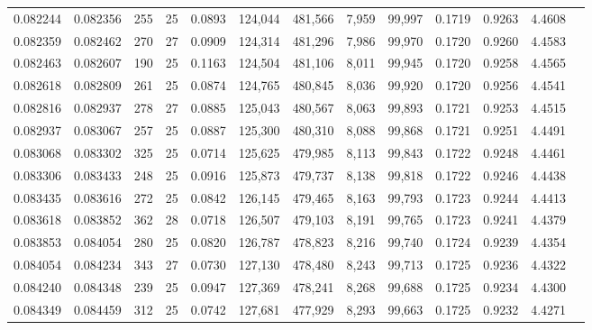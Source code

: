 \begin{tabular}{rrrrrrrrrrrrr}
0.082244 & 0.082356 & 255 &  25 &                                     0.0893 & 124,044 & 481,566 &   7,959 &  99,997 & 0.1719 & 0.9263 & 4.4608 \\
0.082359 & 0.082462 & 270 &  27 &                                     0.0909 & 124,314 & 481,296 &   7,986 &  99,970 & 0.1720 & 0.9260 & 4.4583 \\
0.082463 & 0.082607 & 190 &  25 &                                     0.1163 & 124,504 & 481,106 &   8,011 &  99,945 & 0.1720 & 0.9258 & 4.4565 \\
0.082618 & 0.082809 & 261 &  25 &                                     0.0874 & 124,765 & 480,845 &   8,036 &  99,920 & 0.1720 & 0.9256 & 4.4541 \\
0.082816 & 0.082937 & 278 &  27 &                                     0.0885 & 125,043 & 480,567 &   8,063 &  99,893 & 0.1721 & 0.9253 & 4.4515 \\
0.082937 & 0.083067 & 257 &  25 &                                     0.0887 & 125,300 & 480,310 &   8,088 &  99,868 & 0.1721 & 0.9251 & 4.4491 \\
0.083068 & 0.083302 & 325 &  25 &                                     0.0714 & 125,625 & 479,985 &   8,113 &  99,843 & 0.1722 & 0.9248 & 4.4461 \\
0.083306 & 0.083433 & 248 &  25 &                                     0.0916 & 125,873 & 479,737 &   8,138 &  99,818 & 0.1722 & 0.9246 & 4.4438 \\
0.083435 & 0.083616 & 272 &  25 &                                     0.0842 & 126,145 & 479,465 &   8,163 &  99,793 & 0.1723 & 0.9244 & 4.4413 \\
0.083618 & 0.083852 & 362 &  28 &                                     0.0718 & 126,507 & 479,103 &   8,191 &  99,765 & 0.1723 & 0.9241 & 4.4379 \\
0.083853 & 0.084054 & 280 &  25 &                                     0.0820 & 126,787 & 478,823 &   8,216 &  99,740 & 0.1724 & 0.9239 & 4.4354 \\
0.084054 & 0.084234 & 343 &  27 &                                     0.0730 & 127,130 & 478,480 &   8,243 &  99,713 & 0.1725 & 0.9236 & 4.4322 \\
0.084240 & 0.084348 & 239 &  25 &                                     0.0947 & 127,369 & 478,241 &   8,268 &  99,688 & 0.1725 & 0.9234 & 4.4300 \\
0.084349 & 0.084459 & 312 &  25 &                                     0.0742 & 127,681 & 477,929 &   8,293 &  99,663 & 0.1725 & 0.9232 & 4.4271 \\

\end{tabular}
